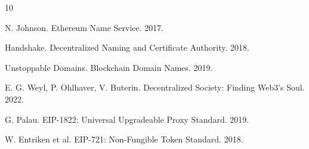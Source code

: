 \documentclass[11pt,twocolumn]{article}
\begin{document}

\begin{thebibliography}{10}

N. Johnson. Ethereum Name Service. 2017.

Handshake. Decentralized Naming and Certificate Authority. 2018.

Unstoppable Domains. Blockchain Domain Names. 2019.

E. G. Weyl, P. Ohlhaver, V. Buterin. Decentralized Society: Finding Web3's Soul. 2022.

G. Palau. EIP-1822: Universal Upgradeable Proxy Standard. 2019.

W. Entriken et al. EIP-721: Non-Fungible Token Standard. 2018.

\end{thebibliography}
\end{document}
